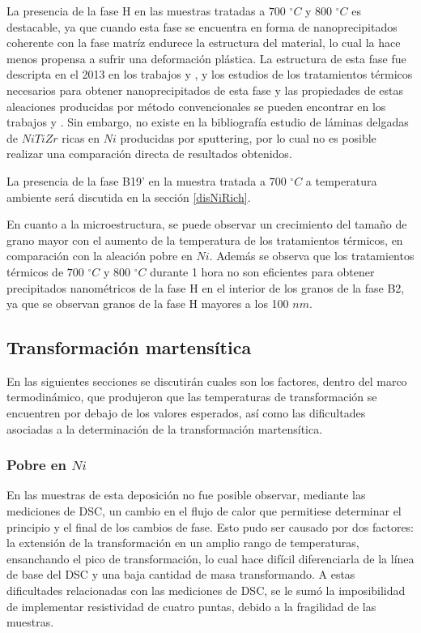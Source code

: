\documentclass[12pt]{article}
\theoremstyle{definition}
\theoremstyle{remark}
\begin{document}
La presencia de la fase H en las muestras tratadas a $700$ $^\circ C$ y $800$ $^\circ C$ es destacable, ya que cuando esta fase se encuentra en forma de nanoprecipitados coherente con la fase matríz endurece la estructura del material, lo cual la hace menos propensa a sufrir una deformación plástica. La estructura de esta fase fue descripta en el 2013 en los trabajos \citep{Santamarta2013} y \citep{Yang2013}, y los estudios de los tratamientos térmicos necesarios para obtener nanoprecipitados de esta fase y las propiedades de estas aleaciones producidas por método convencionales se pueden encontrar en los trabajos \citep{Evirgen2013} \citep{Evirgen2014} \citep{Evirgen2016} \citep{Perez-Sierra2016} \citep{Evirgen2018} y \citep{Bigelow2019}. Sin embargo, no existe en la bibliografía estudio de láminas delgadas de $NiTiZr$ ricas en $Ni$ producidas por sputtering, por lo cual no es posible realizar una comparación directa de resultados obtenidos.

La presencia de la fase B19' en la muestra tratada a $700$ $^\circ C$ a temperatura ambiente será discutida en la sección \ref{disNiRich}.

En cuanto a la microestructura, se puede observar un crecimiento del tamaño de grano mayor con el aumento de la temperatura de los tratamientos térmicos, en comparación con la aleación pobre en $Ni$. Además se observa que los tratamientos térmicos de $700$ $^\circ C$ y $800$ $^\circ C$ durante 1 hora no son eficientes para obtener precipitados nanométricos de la fase H en el interior de los granos de la fase B2, ya que se observan granos de la fase H mayores a los 100 $nm$.


\subsection{Transformación martensítica}
\label{TransfomacionDiscusion}

En las siguientes secciones se discutirán cuales son los factores, dentro del marco termodinámico, que produjeron que las temperaturas de transformación se encuentren por debajo de los valores esperados, así como las dificultades asociadas a la determinación de la transformación martensítica.

\subsubsection{Pobre en $Ni$}
\label{disNiPoor}
En las muestras de esta deposición no fue posible observar, mediante las mediciones de DSC, un cambio en el flujo de calor que permitiese determinar el principio y el final de los cambios de fase. Esto pudo ser causado por dos factores: la extensión de la transformación en un amplio rango de temperaturas, ensanchando el pico de transformación, lo cual hace difícil diferenciarla de la línea de base del DSC y una baja cantidad de masa transformando. A estas dificultades relacionadas con las mediciones de DSC, se le sumó la imposibilidad de implementar resistividad de cuatro puntas, debido a la fragilidad de las muestras.
\end{document}
